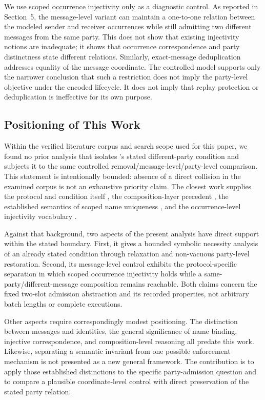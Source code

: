 We use scoped occurrence injectivity only as a diagnostic control. As reported
in Section~5, the message-level variant can maintain a one-to-one relation
between the modeled sender and receiver occurrences while still admitting two
different messages from the same party. This does not show that existing
injectivity notions are inadequate; it shows that occurrence correspondence
and party distinctness state different relations. Similarly, exact-message
deduplication addresses equality of the message coordinate. The controlled
model supports only the narrower conclusion that such a restriction does not
imply the party-level objective under the encoded lifecycle. It does not imply
that replay protection or deduplication is ineffective for its own purpose.

\subsection{Positioning of This Work}

Within the verified literature corpus and search scope used for this paper, we
found no prior analysis that isolates \kwaay's stated different-party
\batchreceive condition and subjects it to the same controlled
removal/message-level/party-level comparison. This statement is intentionally
bounded: absence of a direct collision in the examined corpus is not an
exhaustive priority claim. The closest work supplies the protocol and condition
itself \cite{collins2024kwaay}, the composition-layer precedent
\cite{cremers2023session}, the established semantics of scoped name uniqueness
\cite{lupetti2006names}, and the occurrence-level injectivity vocabulary
\cite{sattarzadeh2015injective}.

Against that background, two aspects of the present analysis have direct
support within the stated boundary. First, it gives a bounded symbolic
necessity analysis of an already stated \batchreceive condition through
relaxation and non-vacuous party-level restoration. Second, its message-level
control exhibits the protocol-specific separation in which scoped occurrence
injectivity holds while a same-party/different-message composition remains
reachable. Both claims concern the fixed two-slot admission abstraction and
its recorded properties, not arbitrary batch lengths or complete \kwaay
executions.

Other aspects require correspondingly modest positioning. The distinction
between messages and identities, the general significance of name binding,
injective correspondence, and composition-level reasoning all predate this
work. Likewise, separating a semantic invariant from one possible enforcement
mechanism is not presented as a new general framework. The contribution is to
apply those established distinctions to the specific \batchreceive
party-admission question and to compare a plausible coordinate-level control
with direct preservation of the stated party relation.

